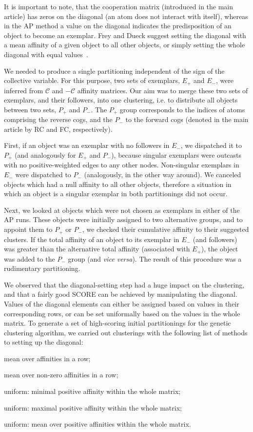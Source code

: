 \documentclass[a4paper,11pt,twoside]{book}%
\begin{document}
\begin{appendices}
It is important to note, that the cooperation matrix (introduced in the main article) has zeros on the diagonal (an atom does not interact with itself), whereas in the AP method a value on the diagonal indicates the predisposition of an object to become an exemplar.
Frey and Dueck suggest setting the diagonal with a mean affinity of a given object to all other objects, or simply setting the whole diagonal with equal values~\cite{frey2007clustering}.

We needed to produce a single partitioning independent of the sign of the collective variable.
For this purpose, two sets of exemplars, $E_+$ and $E_-$, were inferred from $\mathcal{C}$ and $-\mathcal{C}$ affinity matrices.
Our aim was to merge these two sets of exemplars, and their followers, into one clustering, i.e. to distribute all objects between two sets, $P_+$ and $P_-$.
The $P_+$ group corresponds to the indices of atoms comprising the reverse cogs, and the $P_-$ to the forward cogs (denoted in the main article by RC and FC, respectively).

First, if an object was an exemplar with no followers in $E_-$, we dispatched it to $P_+$ (and analogously for $E_+$ and $P_-$), because singular exemplars were outcasts with no positive-weighted edges to any other nodes.
Non-singular exemplars in $E_-$ were dispatched to $P_-$ (analogously, in the other way around).
We canceled objects which had a null affinity to all other objects, therefore a situation in which an object is a singular exemplar in both partitionings did not occur.

Next, we looked at objects which were not chosen as exemplars in either of the AP runs.
These objects were initially assigned to two alternative groups, and to appoint them to $P_+$ or $P_-$, we checked their cumulative affinity to their suggested clusters.
If the total affinity of an object to its exemplar in $E_-$ (and followers) was greater than the alternative total affinity (associated with $E_+$), the object was added to the $P_-$ group (and \emph{vice versa}).
The result of this procedure was a rudimentary partitioning.

We observed that the diagonal-setting step had a huge impact on the clustering, and that a fairly good SCORE can be achieved by manipulating the diagonal.
Values of the diagonal elements can either be assigned based on values in their corresponding rows, or can be set uniformally based on the values in the whole matrix.
To generate a set of high-scoring initial partitionings for the genetic clustering algorithm, we carried out clusterings with the following list of methods to setting up the diagonal:
\begin{packeditemize}
 \item mean over affinities in a row;
 \item mean over non-zero affinities in a row;
 \item uniform: minimal positive affinity within the whole matrix;
 \item uniform: maximal positive affinity within the whole matrix;
 \item uniform: mean over positive affinities within the whole matrix.
\end{packeditemize}


\end{appendices}
\end{document}
